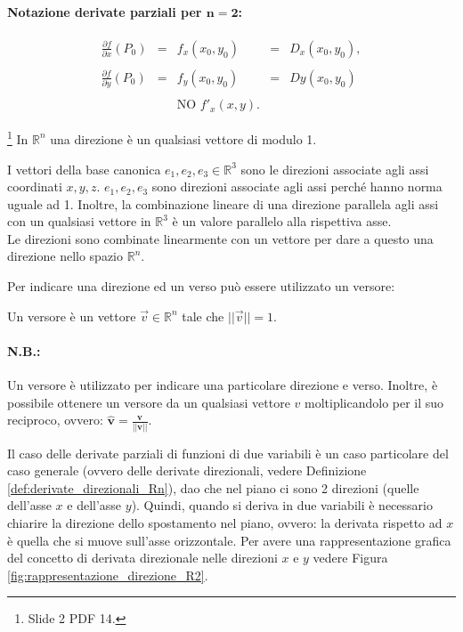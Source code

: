 \paragraph{Notazione derivate parziali per $\boldsymbol{n=2}$:}
\begin{equation*}
	\begin{matrix}
		\frac{\partial f}{\partial x}(P_0)&=&f_x(x_0,y_0)&=& D_x(x_0,y_0),\\\\
		\frac{\partial f}{\partial y}(P_0) &=& f_y(x_0,y_0) &=& Dy(x_0,y_0)\\\\
		&&\text{NO } f'_x(x,y).&&
	\end{matrix}
\end{equation*}

\begin{definition}[Direzione]\footnote{Slide 2 PDF 14.}
    In $\mathbb R^n$ una direzione è un qualsiasi vettore di modulo 1.
\end{definition}
I vettori della base canonica $e_1,e_2,e_3\in\mathbb R^3$ sono le direzioni associate agli assi coordinati $x,y,z$. $e_1,e_2,e_3$ sono direzioni associate agli assi perché hanno norma uguale ad 1. Inoltre, la combinazione lineare di una direzione parallela agli assi con un qualsiasi vettore in $\mathbb R^3$ è un valore parallelo alla rispettiva asse.\\
Le direzioni sono combinate linearmente con un vettore per dare a questo una direzione nello spazio $\mathbb R^n$.

Per indicare una direzione ed un verso può essere utilizzato un versore:
\begin{definition}[Versore]
    Un versore è un vettore $\overset{\rightarrow}{v}\in\mathbb R^n$ tale che $||\overset{\rightarrow}{v}||=1$.
\end{definition}

\paragraph{N.B.:} Un versore è utilizzato per indicare una particolare direzione e verso. Inoltre, è possibile ottenere un versore da un qualsiasi vettore $v$ moltiplicandolo per il suo reciproco, ovvero: $\hat {\mathbf{v}}=\frac{\mathbf{v}}{||\mathbf {v}||}.$

Il caso delle derivate parziali di funzioni di due variabili è un caso particolare del caso generale (ovvero delle derivate direzionali, vedere Definizione \ref{def:derivate_direzionali_Rn}), dao che nel piano ci sono 2 direzioni (quelle dell'asse $x$ e dell'asse $y$). Quindi, quando si deriva in due variabili è necessario chiarire la direzione dello spostamento nel piano, ovvero: la derivata rispetto ad $x$ è quella che si muove sull'asse orizzontale. Per avere una rappresentazione grafica del concetto di derivata direzionale nelle direzioni $x$ e $y$ vedere Figura \ref{fig:rappresentazione_direzione_R2}.

